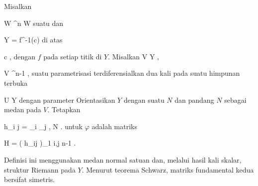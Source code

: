 {}
{

Misalkan

\mavergleichskette
{\vergleichskette
{ W
}
{ \subseteq }{ \R^n
}
{  }{
}
{    }{
}
{   }{
}
}
{}{}{}
 { W } { \R
} {}
suatu
dan

\mavergleichskette
{\vergleichskette
{ Y
}
{ = }{ f^{-1}(c)
}
{  }{
}
{    }{
}
{   }{
}
}
{}{}{}
di atas

\mavergleichskette
{\vergleichskette
{ c
}
{ \in }{ \R
}
{  }{
}
{    }{
}
{   }{
}
}
{}{}{,}
dengan $f$
pada setiap titik di $Y$. Misalkan
\maabbdisp {\varphi} { V } { Y
} {,}

\mavergleichskette
{\vergleichskette
{ V
}
{ \subseteq }{ \R^{n-1}
}
{  }{
}
{    }{
}
{   }{
}
}
{}{}{,}
suatu parametrisasi terdiferensialkan dua kali pada suatu himpunan terbuka

\mavergleichskette
{\vergleichskette
{ U
}
{ \subseteq }{ Y
}
{  }{
}
{    }{
}
{   }{
}
}
{}{}{}
dengan parameter
 Orientasikan $Y$ dengan suatu
$N$
dan pandang $N$ sebagai medan pada $V$. Tetapkan

\mavergleichskettedisp
{\vergleichskette
{ h_{i j}
}
{ =} { \left\langle  \partial_i \partial_j \varphi , N  \right\rangle
}
{ } {
}
{ } {
}
{ } {
}
}
{}{}{.}
untuk $\varphi$ adalah matriks
 {} {}

\mavergleichskettedisp
{\vergleichskette
{ H
}
{ =} { \left(  h_{ij}   \right)_{1 \leq i,j \leq n-1}
}
{ } {
}
{ } {
}
{ } {
}
}
{}{}{.}

}

Definisi ini menggunakan medan normal satuan dan, melalui hasil kali skalar, struktur Riemann pada $Y$. Menurut
teorema Schwarz,
matriks fundamental kedua bersifat simetris.




